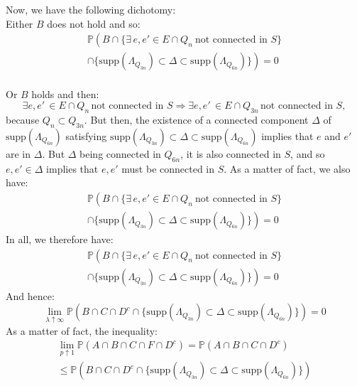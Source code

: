 \documentclass[10pt,a4paper]{amsart}
\theoremstyle{exampstyle}
\theoremstyle{exampnotations}
\begin{document}
Now, we have the following dichotomy: \\
Either $B$ does not hold and so:
\begin{gather*}
    \mathbb{P}\left(B  \cap \Big\lbrace \exists \, e,e' \in E\cap Q_n \: \text{not connected in } S  \Big\rbrace \right. \\ \left. \cap \Big\lbrace \text{supp}(\Lambda_{Q_{3n}}) \subset \Delta \subset \text{supp}(\Lambda_{Q_{6n}}) \Big\rbrace  \right) = 0
\end{gather*} \\
Or $B$ holds and then: 
\begin{equation*}
    \exists e,e' \, \in E \cap Q_n \, \text{not connected in } S \Rightarrow \exists e,e' \, \in E \cap Q_{3n} \, \text{not connected in } S,
\end{equation*}
because $Q_n \subset Q_{3n}$. But then, the existence of a connected component $\Delta$ of $\text{supp}(\Lambda_{Q_{6n}})$ satisfying $\text{supp}(\Lambda_{Q_{3n}}) \subset \Delta \subset \text{supp}(\Lambda_{Q_{6n}})$ implies that $e$ and $e'$ are in $\Delta$. But $\Delta$ being connected in $Q_{6n}$, it is also connected in $S$, and so $e,e' \in \Delta$ implies that $e,e'$ must be connected in $S$. As a matter of fact, we also have:
\begin{gather*}
    \mathbb{P}\left(B  \cap \Big\lbrace \exists \, e,e' \in E\cap Q_n \: \text{not connected in } S  \Big\rbrace \right. \\ \left. \cap \Big\lbrace \text{supp}(\Lambda_{Q_{3n}}) \subset \Delta \subset \text{supp}(\Lambda_{Q_{6n}}) \Big\rbrace  \right) = 0
\end{gather*}
In all, we therefore have:
\begin{gather*}
    \mathbb{P}\left(B  \cap \Big\lbrace \exists \, e,e' \in E\cap Q_n \: \text{not connected in } S  \Big\rbrace \right. \\ \left. \cap \Big\lbrace \text{supp}(\Lambda_{Q_{3n}}) \subset \Delta \subset \text{supp}(\Lambda_{Q_{6n}}) \Big\rbrace  \right) = 0
\end{gather*}
And hence:
\begin{equation*}
   \lim_{\lambda \uparrow \infty} \mathbb{P}\left(B \cap C \cap D^c  \cap \Big\lbrace \text{supp}(\Lambda_{Q_{3n}}) \subset \Delta \subset \text{supp}(\Lambda_{Q_{6n}}) \Big\rbrace \right) = 0 
\end{equation*}
As a matter of fact, the inequality:
\begin{gather*}
    \lim_{p \uparrow 1} \mathbb{P}(A \cap B \cap C \cap F \cap D^{c})  = \mathbb{P}(A \cap B \cap C \cap D^c)  \\ \leq \mathbb{P}\left(B \cap C \cap D^c  \cap \Big\lbrace \text{supp}(\Lambda_{Q_{3n}}) \subset \Delta \subset \text{supp}(\Lambda_{Q_{6n}}) \Big\rbrace \right)
\end{gather*}
\end{document}
